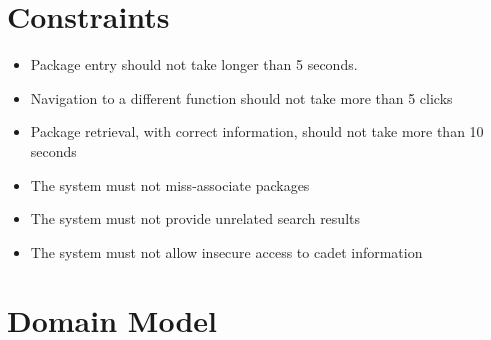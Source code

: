 \documentclass[11pt]{article}
\begin{document}
\section*{Constraints}
\label{sec:org7fb79d7}
\begin{itemize}
\item Package entry should not take longer than 5 seconds.
\item Navigation to a different function should not take more than 5 clicks
\item Package retrieval, with correct information, should not take more than 10 seconds
\item The system must not miss-associate packages
\item The system must not provide unrelated search results
\item The system must not allow insecure access to cadet information
\end{itemize}


\section*{Domain Model}
\label{sec:org05a658d}
\end{document}
